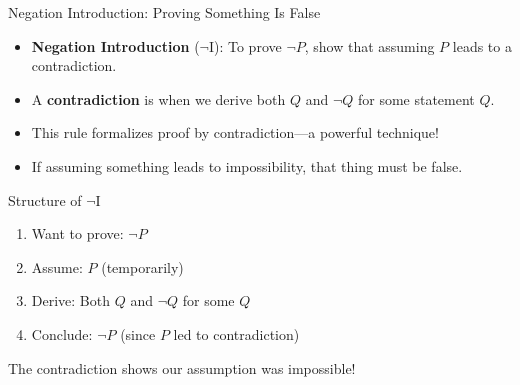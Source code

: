 \documentclass{beamer}
\begin{document}
	\begin{frame}{Negation Introduction: Proving Something Is False}
		\begin{itemize}
			\item \textbf{Negation Introduction} ($\neg$I): To prove $\neg P$, show that assuming $P$ leads to a contradiction.
			\item A \textbf{contradiction} is when we derive both $Q$ and $\neg Q$ for some statement $Q$.
			\item This rule formalizes proof by contradiction—a powerful technique!
			\item If assuming something leads to impossibility, that thing must be false.
		\end{itemize}
		
		\begin{alertblock}{Structure of $\neg$I}
			\begin{enumerate}
				\item Want to prove: $\neg P$
				\item Assume: $P$ (temporarily)
				\item Derive: Both $Q$ and $\neg Q$ for some $Q$
				\item Conclude: $\neg P$ (since $P$ led to contradiction)
			\end{enumerate}
			The contradiction shows our assumption was impossible!
		\end{alertblock}
	\end{frame}
	
\end{document}
